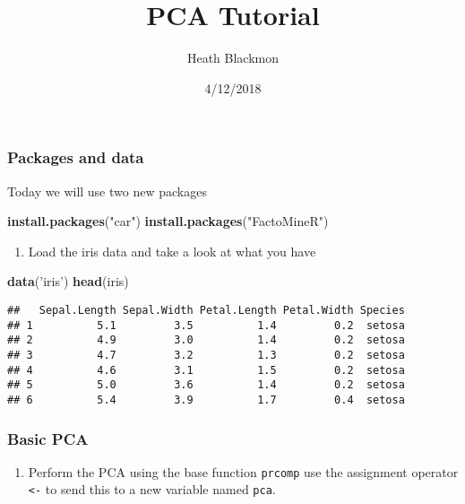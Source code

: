 \documentclass[]{article}
\title{PCA Tutorial}
\author{Heath Blackmon}
\date{4/12/2018}
\newenvironment{Shaded}{\begin{snugshade}}{\end{snugshade}}
\newcommand{\KeywordTok}[1]{\textcolor[rgb]{0.13,0.29,0.53}{\textbf{#1}}}
\newcommand{\NormalTok}[1]{#1}
\newcommand{\StringTok}[1]{\textcolor[rgb]{0.31,0.60,0.02}{#1}}
\providecommand{\tightlist}{%
  \setlength{\itemsep}{0pt}\setlength{\parskip}{0pt}}
\begin{document}
\maketitle

{
\setcounter{tocdepth}{3}
\tableofcontents
}
\hypertarget{packages-and-data}{%
\subsubsection{Packages and data}\label{packages-and-data}}

Today we will use two new packages

\begin{Shaded}
\begin{Highlighting}[]
\KeywordTok{install.packages}\NormalTok{(}\StringTok{"car"}\NormalTok{)}
\KeywordTok{install.packages}\NormalTok{(}\StringTok{"FactoMineR"}\NormalTok{)}
\end{Highlighting}
\end{Shaded}

\begin{enumerate}
\def\labelenumi{\arabic{enumi})}
\tightlist
\item
  Load the iris data and take a look at what you have
\end{enumerate}

\begin{Shaded}
\begin{Highlighting}[]
\KeywordTok{data}\NormalTok{(}\StringTok{'iris'}\NormalTok{)}
\KeywordTok{head}\NormalTok{(iris)}
\end{Highlighting}
\end{Shaded}

\begin{verbatim}
##   Sepal.Length Sepal.Width Petal.Length Petal.Width Species
## 1          5.1         3.5          1.4         0.2  setosa
## 2          4.9         3.0          1.4         0.2  setosa
## 3          4.7         3.2          1.3         0.2  setosa
## 4          4.6         3.1          1.5         0.2  setosa
## 5          5.0         3.6          1.4         0.2  setosa
## 6          5.4         3.9          1.7         0.4  setosa
\end{verbatim}

\hypertarget{basic-pca}{%
\subsubsection{Basic PCA}\label{basic-pca}}

\begin{enumerate}
\def\labelenumi{\arabic{enumi})}
\setcounter{enumi}{1}
\tightlist
\item
  Perform the PCA using the base function \texttt{prcomp} use the
  assignment operator \texttt{\textless{}-} to send this to a new
  variable named \texttt{pca}.
\end{enumerate}
\end{document}

